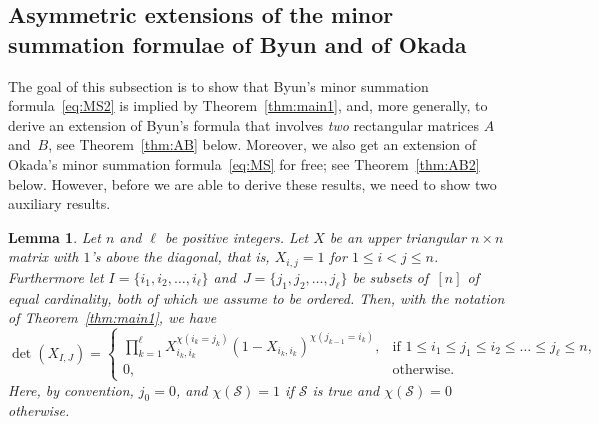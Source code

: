 \documentclass[12pt,reqno]{amsart}
\numberwithin{equation}{section}
\newtheorem{lemma}[theorem]{Lemma}
\theoremstyle{definition}
\theoremstyle{remark}
\begin{document}
\subsection{Asymmetric extensions of the minor summation formulae of
Byun and of Okada}
\label{sec:AB}

The goal of this subsection is to show that Byun's minor summation
formula~\eqref{eq:MS2} is implied by Theorem~\ref{thm:main1}, and,
more generally, to derive an extension of Byun's formula that
involves {\it two} rectangular matrices $A$ and~$B$, see
Theorem~\ref{thm:AB} below. Moreover, we also get an extension of
Okada's minor summation formula~\eqref{eq:MS} for free; see
Theorem~\ref{thm:AB2} below.
However, before we are able to derive these results, we need to show 
two auxiliary results.

\begin{lemma} \label{lem:X1}
Let $n$ and $\ell$ be positive integers.
Let $X$ be an upper triangular $n\times n$ matrix with $1$'s above
the diagonal, that is, $X_{i,j}=1$ for $1\le i<j\le n$.
Furthermore let $I=\{i_1,i_2,\dots,i_\ell\}$ and~$J=\{j_1,j_2,\dots,j_\ell\}$
be subsets of~$[n]$ of equal cardinality, both of which we assume to
be ordered.
Then, with the notation of Theorem~\ref{thm:main1}, we have
\begin{equation} \label{eq:X1} 
\det(X_{I,J})=\begin{cases}
\prod _{k=1} ^{\ell}X_{i_k,i_k}^{\chi(i_k=j_k)}
(1-X_{i_k,i_k})^{\chi(j_{k-1}=i_k)},&
\text{if }1\le i_1\le j_1\le i_2\le\dots\le j_\ell\le n,\\
0,&\text{otherwise}.
\end{cases}
\end{equation}
Here, by convention, $j_0=0$, and
$\chi(\mathcal S)=1$ if $\mathcal S$ is true and
$\chi(\mathcal S)=0$ otherwise.
\end{lemma} 
\end{document}

